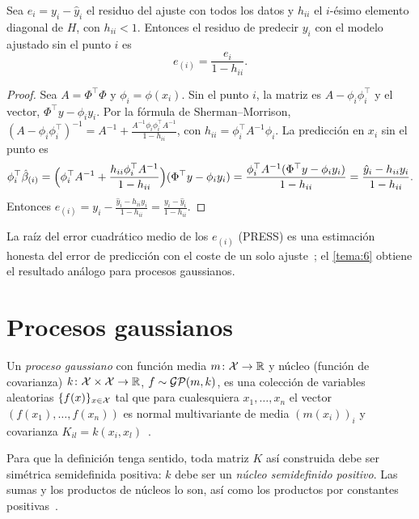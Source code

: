 \begin{proposicion}\label{prop:loo-lineal}
Sea $e_i=y_i-\hat y_i$ el residuo del ajuste con todos los datos y $h_{ii}$ el $i$-ésimo elemento diagonal de $H$, con $h_{ii}<1$. Entonces el residuo de predecir $y_i$ con el modelo ajustado sin el punto $i$ es
\[
e_{(i)}=\frac{e_i}{1-h_{ii}} .
\]
\end{proposicion}

\begin{proof}
Sea $A=\Phi^\top\Phi$ y $\phi_i=\phi(x_i)$. Sin el punto $i$, la matriz es $A-\phi_i\phi_i^\top$ y el vector, $\Phi^\top y-\phi_iy_i$. Por la fórmula de Sherman--Morrison, $(A-\phi_i\phi_i^\top)^{-1}=A^{-1}+\frac{A^{-1}\phi_i\phi_i^\top A^{-1}}{1-h_{ii}}$, con $h_{ii}=\phi_i^\top A^{-1}\phi_i$. La predicción en $x_i$ sin el punto es
\[
\phi_i^\top\hat\beta_{(i)}=\Bigl(\phi_i^\top A^{-1}+\frac{h_{ii}\phi_i^\top A^{-1}}{1-h_{ii}}\Bigr)(\Phi^\top y-\phi_iy_i)=\frac{\phi_i^\top A^{-1}(\Phi^\top y-\phi_iy_i)}{1-h_{ii}}=\frac{\hat y_i-h_{ii}y_i}{1-h_{ii}} .
\]
Entonces $e_{(i)}=y_i-\frac{\hat y_i-h_{ii}y_i}{1-h_{ii}}=\frac{y_i-\hat y_i}{1-h_{ii}}$.
\end{proof}

La raíz del error cuadrático medio de los $e_{(i)}$ (PRESS) es una estimación honesta del error de predicción con el coste de un solo ajuste~\cite[§14.5]{kw}; el \cref{tema:6} obtiene el resultado análogo para procesos gaussianos.

\section{Procesos gaussianos}

\begin{definicion}\label{def:gp}
Un \emph{proceso gaussiano} con función media $m\colon\mathcal{X}\to\mathbb{R}$ y núcleo (función de covarianza) $k\colon\mathcal{X}\times\mathcal{X}\to\mathbb{R}$, $f\sim\mathcal{GP}(m,k)$, es una colección de variables aleatorias $\{f(x)\}_{x\in\mathcal{X}}$ tal que para cualesquiera $x_1,\dots,x_n$ el vector $(f(x_1),\dots,f(x_n))$ es normal multivariante de media $(m(x_i))_i$ y covarianza $K_{il}=k(x_i,x_l)$~\cite[cap.~2]{rw}.
\end{definicion}

Para que la definición tenga sentido, toda matriz $K$ así construida debe ser simétrica semidefinida positiva: $k$ debe ser un \emph{núcleo semidefinido positivo}. Las sumas y los productos de núcleos lo son, así como los productos por constantes positivas~\cite[cap.~4]{rw}.

